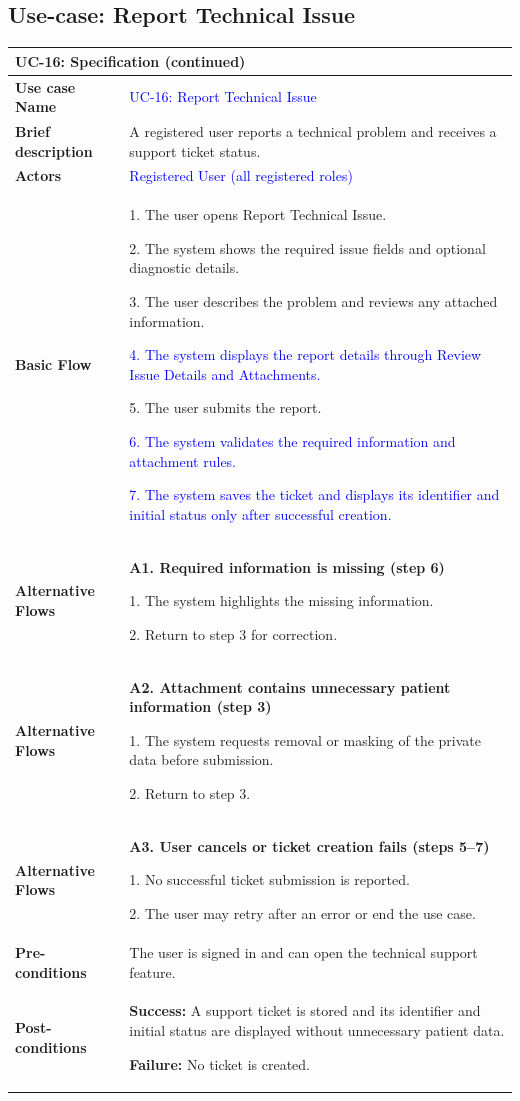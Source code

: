 \subsection{Use-case: Report Technical Issue}
\label{uc:uc-16}
\begin{longtable}{|p{}|p{}|}
\hline
\endfirsthead
\multicolumn{2}{l}{\textbf{UC-16: Specification (continued)}}\\
\hline
\endhead
\textbf{Use case Name} &
\textcolor{blue}{UC-16: Report Technical Issue}
\\ \hline
\textbf{Brief description} &
A registered user reports a technical problem and receives a support ticket status.
\\ \hline
\textbf{Actors} &
\textcolor{blue}{Registered User (all registered roles)}
\\ \hline
\textbf{Basic Flow} &
1. The user opens Report Technical Issue.\par
2. The system shows the required issue fields and optional diagnostic details.\par
3. The user describes the problem and reviews any attached information.\par
\textcolor{blue}{4. The system displays the report details through Review Issue Details and Attachments.}\par
5. The user submits the report.\par
\textcolor{blue}{6. The system validates the required information and attachment rules.}\par
\textcolor{blue}{7. The system saves the ticket and displays its identifier and initial status only after successful creation.}
\\ \hline
\textbf{Alternative Flows} &
\textbf{A1. Required information is missing (step 6)}\par
1. The system highlights the missing information.\par
2. Return to step 3 for correction.
\\ \hline
\textbf{Alternative Flows} &
\textbf{A2. Attachment contains unnecessary patient information (step 3)}\par
1. The system requests removal or masking of the private data before submission.\par
2. Return to step 3.
\\ \hline
\textbf{Alternative Flows} &
\textbf{A3. User cancels or ticket creation fails (steps 5--7)}\par
1. No successful ticket submission is reported.\par
2. The user may retry after an error or end the use case.
\\ \hline
\textbf{Pre-conditions} &
The user is signed in and can open the technical support feature.
\\ \hline
\textbf{Post-conditions} &
\textbf{Success:} A support ticket is stored and its identifier and initial status are displayed without unnecessary patient data.\par
\textbf{Failure:} No ticket is created.
\\ \hline
\end{longtable}
\clearpage
